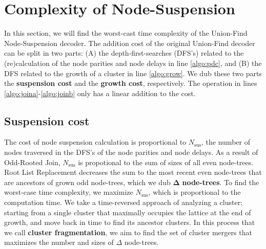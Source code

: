 
\section{Complexity of Node-Suspension}\label{sec:complexity}

In this section, we will find the worst-cast time complexity of the Union-Find Node-Suspension decoder. The addition cost of the original Union-Find decoder can be split in two parts: (A) the depth-first-searches (DFS's) related to the (re)calculation of the node parities and node delays in line \ref{algo:pdc}, and (B) the DFS related to the growth of a cluster in line \ref{algo:grow}. We dub these two parts the \textbf{suspension cost} and the \textbf{growth cost}, respectively. The  operation in lines \ref{algo:joina}-\ref{algo:joinb} only has a linear addition to the cost.

\subsection{Suspension cost}\label{sec:suscomplexity}

The cost of node suspension calculation is proportional to $N_{\text{sus}}$, the number of nodes traversed in the DFS's of the node parities and node delays. As a result of Odd-Rooted Join, $N_{\text{sus}}$ is propotional to the sum of sizes of all even node-trees. Root List Replacement decreases the sum to the most recent even node-trees that are ancestors of grown odd node-trees, which we dub $\mathbf{\Delta}$ \textbf{node-trees}. To find the worst-case time complexity, we maximize $N_{\text{sus}}$, which is proportional to the computation time. We take a time-reversed approach of analyzing a cluster; starting from a single cluster that maximally occupies the lattice at the end of growth, and move back in time to find its ancestor clusters. In this process that we call \textbf{cluster fragmentation}, we aim to find the set of cluster mergers that maximizes the number and sizes of $\Delta$ node-trees. 




